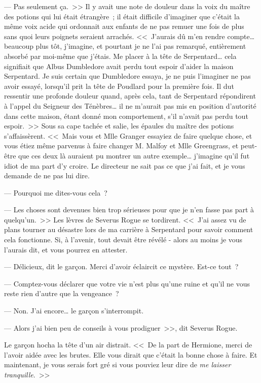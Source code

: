 --- Pas seulement ça.~>> Il y avait une note de douleur dans la voix du maître des potions qui lui était étrangère~; il était difficile d'imaginer que c'était la même voix acide qui ordonnait aux enfants de ne pas remuer une fois de plus sans quoi leurs poignets seraient arrachés. <<~J'aurais dû m'en rendre compte… beaucoup plus tôt, j'imagine, et pourtant je ne l'ai pas remarqué, entièrement absorbé par moi-même que j'étais. Me placer à la tête de Serpentard… cela signifiait que Albus Dumbledore avait perdu tout espoir d'aider la maison Serpentard. Je suis certain que Dumbledore essaya, je ne puis l'imaginer ne pas avoir essayé, lorsqu'il prit la tête de Poudlard pour la première fois. Il dut ressentir une profonde douleur quand, après cela, tant de Serpentard répondirent à l'appel du Seigneur des Ténèbres… il ne m'aurait pas mis en position d'autorité dans cette maison, étant donné mon comportement, s'il n'avait pas perdu tout espoir.~>> Sous sa cape tachée et salie, les épaules du maître des potions s'affaissèrent. <<~Mais vous et Mlle Granger essayiez de faire quelque chose, et vous étiez même parvenus à faire changer M. Malfoy et Mlle Greengrass, et peut-être que ces deux là auraient pu montrer un autre exemple… j'imagine qu'il fut idiot de ma part d'y croire. Le directeur ne sait pas ce que j'ai fait, et je vous demande de ne pas lui dire.

--- Pourquoi me dites-vous cela~?

--- Les choses sont devenues bien trop sérieuses pour que je n'en fasse pas part à quelqu'un.~>> Les lèvres de Severus Rogue se tordirent. <<~J'ai assez vu de plans tourner au désastre lors de ma carrière à Serpentard pour savoir comment cela fonctionne. Si, à l'avenir, tout devait être révélé - alors au moins je vous l'aurais dit, et vous pourrez en attester.

--- Délicieux, dit le garçon. Merci d'avoir éclaircit ce mystère. Est-ce tout~?

--- Comptez-vous déclarer que votre vie n'est plus qu'une ruine et qu'il ne vous reste rien d'autre que la vengeance~?

--- Non. J'ai encore… le garçon s'interrompit.

--- Alors j'ai bien peu de conseils à vous prodiguer~>>, dit Severus Rogue.

Le garçon hocha la tête d'un air distrait. <<~De la part de Hermione, merci de l'avoir aidée avec les brutes. Elle vous dirait que c'était la bonne chose à faire. Et maintenant, je vous serais fort gré si vous pouviez leur dire de \emph{me laisser tranquille}.~>>

